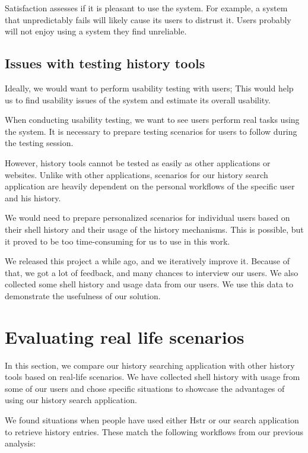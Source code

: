 Satisfaction assesses if it is pleasant to use the system. For example, a system that unpredictably fails will likely cause its users to distrust it. Users probably will not enjoy using a system they find unreliable. 

\subsection{Issues with testing history tools}

Ideally, we would want to perform usability testing with users; This would help us to find usability issues of the system and estimate its overall usability.

When conducting usability testing, we want to see users perform real tasks using the system. It is necessary to prepare testing scenarios for users to follow during the testing session.

However, history tools cannot be tested as easily as other applications or websites.
Unlike with other applications, scenarios for our history search application are heavily dependent on the personal workflows of the specific user and his history.


We would need to prepare personalized scenarios for individual users based on their shell history and their usage of the history mechanisms.
This is possible, but it proved to be too time-consuming for us to use in this work.

We released this project a while ago, and we iteratively improve it. Because of that, we got a lot of feedback, and many chances to interview our users. We also collected some shell history and usage data from our users. We use this data to demonstrate the usefulness of our solution.

\section{Evaluating real life scenarios}\label{test-real-life-scenarios}

In this section, we compare our history searching application with other history tools based on real-life scenarios. We have collected shell history with usage from some of our users and chose specific situations to showcase the advantages of using our history search application.

We found situations when people have used either Hstr\cite{toolshstr} or our search application to retrieve history entries. These match the following workflows from our previous analysis:


